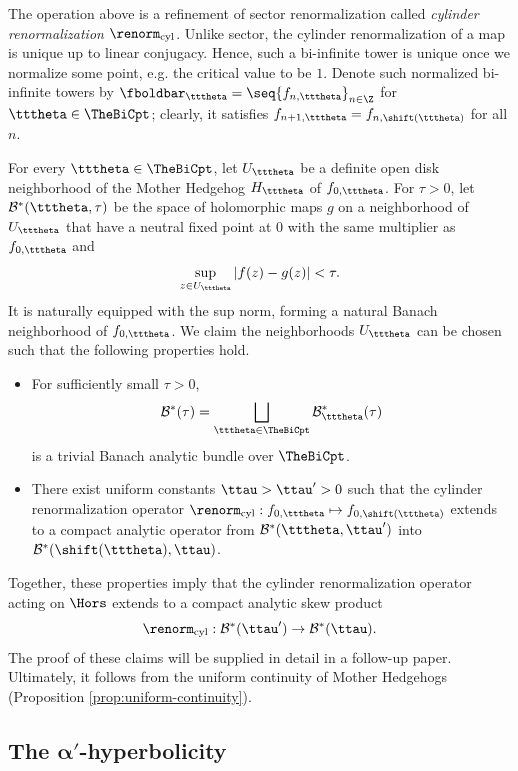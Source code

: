 \documentclass{amsart}
\begin{document}
The operation above is a refinement of sector renormalization called \emph{cylinder renormalization} $\renorm_{\textnormal{cyl}}$.
Unlike sector, the cylinder renormalization of a map is unique up to linear conjugacy.
Hence, such a bi-infinite tower is unique once we normalize some point, e.g. the critical value to be $1$.
Denote such normalized bi-infinite towers by $\fboldbar_{\tttheta} = \seq{ f_{n,\tttheta}}_{n\in\Z}$ for $\tttheta \in \TheBiCpt$; clearly, it satisfies $f_{n+1,\tttheta} = f_{n,\shift (\tttheta)}$ for all $n$.

For every $\tttheta \in \TheBiCpt$, let $U_{\tttheta}$ be a definite open disk neighborhood of the Mother Hedgehog $H_{\tttheta}$ of $f_{0,\tttheta}$.
For $\tau >0$, let $\mathcal{B}^*(\tttheta,\tau)$ be the space of holomorphic maps $g$ on a neighborhood of $U_{\tttheta}$ that have a neutral fixed point at $0$ with the same multiplier as $f_{0,\tttheta}$ and 
\[
\sup_{z \in U_{\tttheta}} |f(z)-g(z)| < \tau.
\]
It is naturally equipped with the sup norm, forming a natural Banach neighborhood of $f_{0,\tttheta}$.
We claim the neighborhoods $U_{\tttheta}$ can be chosen such that the following properties hold.
\begin{itemize}
    \item For sufficiently small $\tau>0$, 
    \[
        \mathcal{B}^*(\tau) = \bigsqcup_{\tttheta \in \TheBiCpt} \mathcal{B}^*_{\tttheta}(\tau)
    \]
    is a trivial Banach analytic bundle over $\TheBiCpt$.
    \item There exist uniform constants $\ttau > \ttau' > 0$ such that the cylinder renormalization operator $\renorm_{\textnormal{cyl}}: f_{0,\tttheta} \mapsto f_{0,\shift(\tttheta)}$ extends to a compact analytic operator from $\mathcal{B}^*(\tttheta,\ttau')$ into $\mathcal{B}^*(\shift(\tttheta),\ttau)$.
\end{itemize}
Together, these properties imply that the cylinder renormalization operator acting on $\Hors$ extends to a compact analytic skew product
\[
    \renorm_{\textnormal{cyl}}: \mathcal{B}^*(\ttau') \to \mathcal{B}^*(\ttau).
\]
The proof of these claims will be supplied in detail in a follow-up paper.
Ultimately, it follows from the uniform continuity of Mother Hedgehogs (Proposition \ref{prop:uniform-continuity}).

\subsection{The $\boldsymbol\alpha'$-hyperbolicity}\label{ss:alpha'.hyperb}
\end{document}
